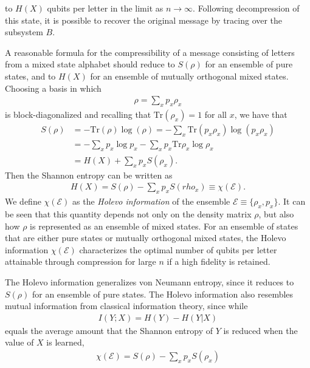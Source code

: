 \documentclass[a4paper, 12pt]{article}
\numberwithin{equation}{section}
\numberwithin{figure}{section}
\theoremstyle{definition}
\begin{document}
    to $H(X)$ qubits per letter in the limit as $n \to \infty$. Following decompression of this state, it is possible to recover the original message by tracing over the subsystem $B$. \par
    A reasonable formula for the compressibility of a message consisting of letters from a mixed state alphabet should reduce to $S(\rho)$ for an ensemble of pure states, and to $H(X)$ for an ensemble of mutually orthogonal mixed states. Choosing a basis in which
    \begin{align}
        \rho = \sum_x p_x \rho_x
    \end{align}
    is block-diagonalized and recalling that $\text{Tr}(\rho_x) = 1$ for all $x$, we have that
    \begin{align}
        S(\rho) &= -\text{Tr}(\rho) \log(\rho) = -\sum_x \text{Tr}(p_x \rho_x) \log(p_x \rho_x) \\
        &= -\sum_x p_x \log p_x - \sum_x p_x \text{Tr} \rho_x \log \rho_x \\
        &= H(X) + \sum_x p_x S(\rho_x).
    \end{align}
    Then the Shannon entropy can be written as
    \begin{align}
        H(X) = S(\rho) - \sum_x p_x S(rho_x) \equiv \chi(\mathcal{E}).
    \end{align}
    We define $\chi(\mathcal{E})$ as the \textit{Holevo information} of the ensemble $\mathcal{E} \equiv \{ \rho_x, p_x \}$. It can be seen that this quantity depends not only on the density matrix $\rho$, but also how $\rho$ is represented as an ensemble of mixed states. For an ensemble of states that are either pure states or mutually orthogonal mixed states, the Holevo information $\chi(\mathcal{E})$ characterizes the optimal number of qubits per letter attainable through compression for large $n$ if a high fidelity is retained. \par
    The Holevo information generalizes von Neumann entropy, since it reduces to $S(\rho)$ for an ensemble of pure states. The Holevo information also resembles mutual information from classical information theory, since while
    \begin{align}
        I(Y; X) = H(Y) - H(Y | X)
    \end{align}
    equals the average amount that the Shannon entropy of $Y$ is reduced when the value of $X$ is learned,
    \begin{align}
        \chi(\mathcal{E}) = S(\rho) - \sum_x p_x S(\rho_x)
    \end{align}
\end{document}
